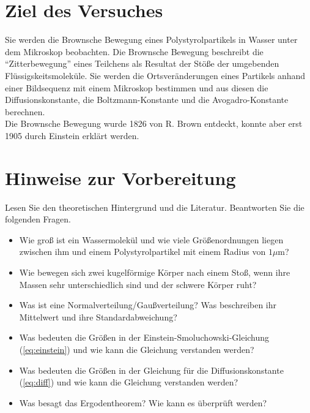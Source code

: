 \section*{Ziel des Versuches}

Sie werden die Brownsche Bewegung eines Polystyrolpartikels in Wasser unter dem Mikroskop beobachten. Die Brownsche Bewegung beschreibt die ``Zitterbewegung'' eines Teilchens als Resultat der Stöße der umgebenden Flüssigskeitsmoleküle. Sie werden  die Ortsveränderungen eines Partikels anhand einer Bildsequenz mit einem Mikroskop bestimmen und aus diesen die Diffusionskonstante, die Boltzmann-Konstante und die Avogadro-Konstante berechnen.\\
Die Brownsche Bewegung wurde 1826 von R. Brown entdeckt, konnte aber erst 1905 durch Einstein erklärt werden.

\section*{Hinweise zur Vorbereitung}
Lesen Sie den theoretischen Hintergrund und die Literatur. Beantworten Sie die folgenden Fragen.

\begin{itemize}
  \item Wie groß ist ein Wassermolekül und wie viele Größenordnungen liegen zwischen ihm und einem Polystyrolpartikel mit einem Radius von $1 \mu$m?
  \item Wie bewegen sich zwei kugelförmige Körper nach einem Stoß, wenn ihre Massen sehr unterschiedlich sind und der schwere Körper ruht?
  \item Was ist eine Normalverteilung/Gaußverteilung? Was beschreiben ihr Mittelwert und ihre Standardabweichung?
  \item Was bedeuten die Größen in der Einstein-Smoluchowski-Gleichung (\ref{eq:einstein}) und wie kann die Gleichung verstanden werden?
  \item Was bedeuten die Größen in der Gleichung für die Diffusionskonstante (\ref{eq:diff}) und wie kann die Gleichung verstanden werden?
  \item Was besagt das Ergodentheorem? Wie kann es überprüft werden?
\end{itemize}
